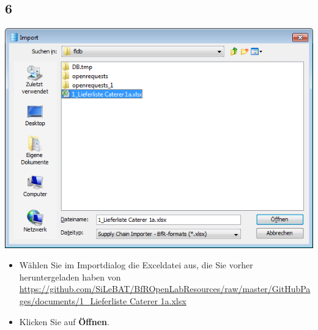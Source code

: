 \documentclass{beamer}
\begin{document}
\subsection{6}
\begin{frame}
	\begin{center}
  		\includegraphics[height=0.6\textheight]{6.png}
	\end{center}
	\begin{itemize}
		\item Wählen Sie im Importdialog die Exceldatei aus, die Sie vorher heruntergeladen haben von  \url{https://github.com/SiLeBAT/BfROpenLabResources/raw/master/GitHubPages/documents/1_Lieferliste Caterer 1a.xlsx}
		\item Klicken Sie auf \textbf{Öffnen}.
	\end{itemize}
\end{frame}
\end{document}
